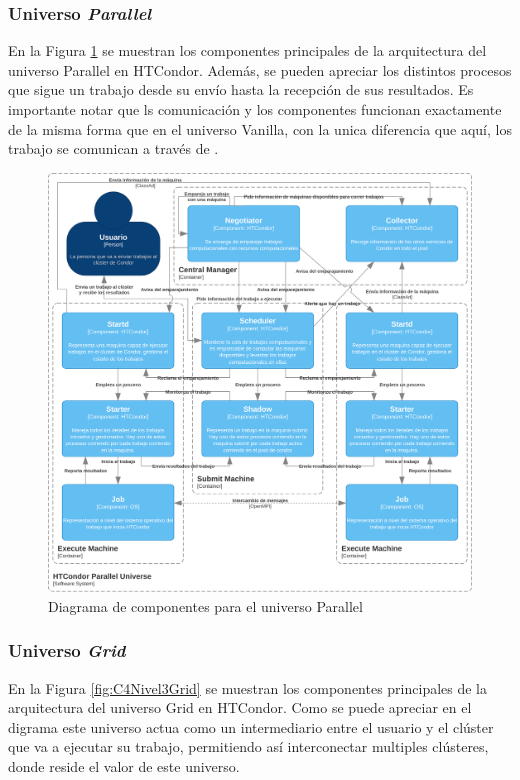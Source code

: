 \subsubsection{Universo \textit{Parallel}}
\noindent
En la Figura \ref{fig:C4Nivel3Parallel} se muestran los componentes principales de la arquitectura del universo Parallel en HTCondor. Además, se pueden apreciar los distintos procesos que sigue un trabajo desde su envío hasta la recepción de sus resultados. Es importante notar que ls comunicación y los componentes funcionan exactamente de la misma forma que en el universo Vanilla, con la unica diferencia que aquí, los trabajo se comunican a través de \MPI.

\begin{figure}[H]
	\centering
	\includegraphics[scale=0.09]{tablas-images/C4/Diagramas HTCondor-Nivel 3 - Parallel.drawio.png}
	\caption{Diagrama de componentes para el universo Parallel}
    \label{fig:C4Nivel3Parallel}
\end{figure}

\subsubsection{Universo \textit{Grid}}
\noindent
En la Figura \ref{fig:C4Nivel3Grid} se muestran los componentes principales de la arquitectura del universo Grid en HTCondor. Como se puede apreciar en el digrama este universo actua como un intermediario entre el usuario y el clúster que va a ejecutar su trabajo, permitiendo así interconectar multiples clústeres, donde reside el valor de este universo.

